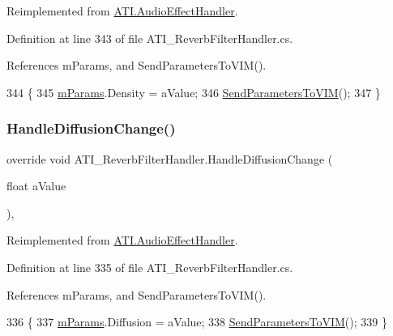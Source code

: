 Reimplemented from \hyperlink{class_a_t_i_1_1_audio_effect_handler_acdbfbd384e2fdb5bd43ad977e264500a}{A\+T\+I.\+Audio\+Effect\+Handler}.



Definition at line 343 of file A\+T\+I\+\_\+\+Reverb\+Filter\+Handler.\+cs.



References m\+Params, and Send\+Parameters\+To\+V\+I\+M().


\begin{DoxyCode}
344     \{
345         \hyperlink{class_a_t_i___reverb_filter_handler_a034260fbce2052b42bceddc891632347}{mParams}.Density = aValue;
346         \hyperlink{class_a_t_i___reverb_filter_handler_aacb469dc3038fca616d638f6a5a04a30}{SendParametersToVIM}();
347     \}
\end{DoxyCode}
\mbox{\label{class_a_t_i___reverb_filter_handler_a6cd79af5d1835bd4ab8a6420fed82e53}} 
\subsubsection{\texorpdfstring{Handle\+Diffusion\+Change()}{HandleDiffusionChange()}}
{\footnotesize\ttfamily override void A\+T\+I\+\_\+\+Reverb\+Filter\+Handler.\+Handle\+Diffusion\+Change (\begin{DoxyParamCaption}\item[{float}]{a\+Value }\end{DoxyParamCaption})\hspace{0.3cm}{\ttfamily [protected]}, {\ttfamily [virtual]}}



Reimplemented from \hyperlink{class_a_t_i_1_1_audio_effect_handler_adcf777de620420b6c411350db0eca2aa}{A\+T\+I.\+Audio\+Effect\+Handler}.



Definition at line 335 of file A\+T\+I\+\_\+\+Reverb\+Filter\+Handler.\+cs.



References m\+Params, and Send\+Parameters\+To\+V\+I\+M().


\begin{DoxyCode}
336     \{
337         \hyperlink{class_a_t_i___reverb_filter_handler_a034260fbce2052b42bceddc891632347}{mParams}.Diffusion = aValue;
338         \hyperlink{class_a_t_i___reverb_filter_handler_aacb469dc3038fca616d638f6a5a04a30}{SendParametersToVIM}();
339     \}
\end{DoxyCode}
\mbox{\label{class_a_t_i___reverb_filter_handler_a0af6a4381b725183fdb7cc8589a9f71f}} 
